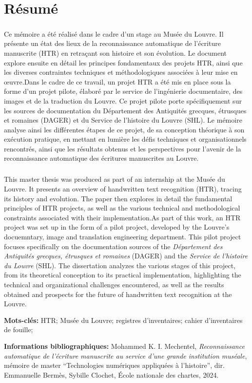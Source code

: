 \documentclass[a4paper,12pt,twoside]{book}
\begin{document}
	\chapter{Résumé}
	{\fontsize{11pt}{13pt}\selectfont 
	\paragraph{}
	Ce mémoire a été réalisé dans le cadre d'un stage au Musée du Louvre. Il présente un état des lieux de la reconnaissance automatique de l'écriture manuscrite (HTR) en retraçant son histoire et son évolution. Le document explore ensuite en détail les principes fondamentaux des projets HTR, ainsi que les diverses contraintes techniques et méthodologiques associées à leur mise en œuvre.Dans le cadre de ce travail, un projet HTR a été mis en place sous la forme d'un projet pilote, élaboré par le service de l'ingénierie documentaire, des images et de la traduction du Louvre. Ce projet pilote porte spécifiquement sur les sources de documentation du Département des Antiquités grecques, étrusques et romaines (DAGER) et du Service de l'histoire du Louvre (SHL). Le mémoire analyse ainsi les différentes étapes de ce projet, de sa conception théorique à son exécution pratique, en mettant en lumière les défis techniques et organisationnels rencontrés, ainsi que les résultats obtenus et les perspectives pour l'avenir de la reconnaissance automatique des écritures manuscrites au Louvre.
	
	\paragraph{}
	This master thesis was produced as part of an internship at the Musée du Louvre. It presents an overview of handwritten text recognition (HTR), tracing its history and evolution. The paper then explores in detail the fundamental principles of HTR projects, as well as the various technical and methodological constraints associated with their implementation.As part of this work, an HTR project was set up in the form of a pilot project, developed by the Louvre's docuemntary, image and translation engineering department. This pilot project focuses specifically on the documentation sources of the \textit{Département des Antiquités grecques, étrusques et romaines} (DAGER) and the \textit{Service de l'histoire du Louvre} (SHL). The dissertation analyzes the various stages of this project, from its theoretical conception to its practical implementation, highlighting the technical and organizational challenges encountered, as well as the results obtained and prospects for the future of handwritten text recognition at the Louvre.
	
	\textbf{Mots-clés:} HTR; Musée du Louvre; registres d'inventaires; cahier d'inventaires de fouille;
	
	\textbf{Informations bibliographiques:} Mohammed K. I. Mechentel, \textit{Reconnaissance automatique de l'écriture manuscrite au service d'une grande institution muséale}, mémoire de master \enquote{Technologies numériques appliquées à l'histoire}, dir. Emmanuelle Bermès, Sybille Clochet, École nationale des chartes, 2024.}	
	\newpage{\pagestyle{empty}\cleardoublepage}
	
\end{document}
